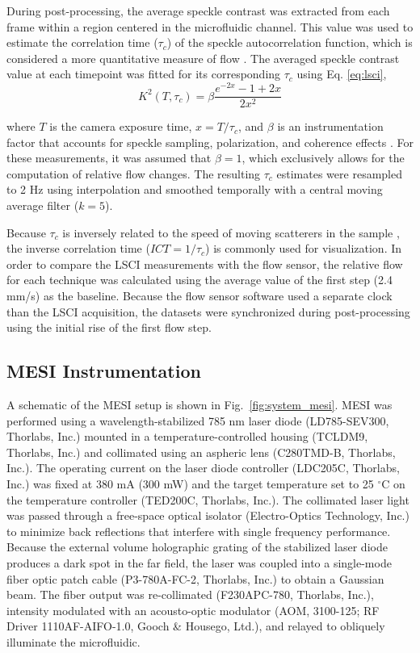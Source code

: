 \documentclass[12pt]{spieman}
\begin{document}
\begin{spacing}{2}
During post-processing, the average speckle contrast was extracted from each frame within a region centered in the microfluidic channel. This value was used to estimate the correlation time ($\tau_{c}$) of the speckle autocorrelation function, which is considered a more quantitative measure of flow \cite{Briers:1996kfa}. The averaged speckle contrast value at each timepoint was fitted for its corresponding $\tau_{c}$ using Eq. \ref{eq:lsci},
%
\begin{equation}
    \label{eq:lsci}
    K^2(T, \tau_{c}) = \beta\frac{e^{-2x}-1+2x}{2x^2}
\end{equation}

\noindent where $T$ is the camera exposure time, $x=T/\tau_{c}$, and $\beta$ is an instrumentation factor that accounts for
speckle sampling, polarization, and coherence effects \cite{Bandyopadhyay:2005bg}. For these measurements, it was assumed that $\beta=1$, which exclusively allows for the computation of relative flow changes. The resulting $\tau_c$ estimates were resampled to 2 Hz using interpolation and smoothed temporally with a central moving average filter ($k=5$).

Because $\tau_c$ is inversely related to the speed of moving scatterers in the sample \cite{Bonner:1981hg}, the inverse correlation time ($ICT = 1/\tau_c$) is commonly used for visualization. In order to compare the LSCI measurements with the flow sensor, the relative flow for each technique was calculated using the average value of the first step (2.4 mm/s) as the baseline. Because the flow sensor software used a separate clock than the LSCI acquisition, the datasets were synchronized during post-processing using the initial rise of the first flow step.


\subsection{MESI Instrumentation}
\label{sect:methods_mesi_system}

A schematic of the MESI setup is shown in Fig.~\ref{fig:system_mesi}. MESI was performed using a wavelength-stabilized 785 nm laser diode (LD785-SEV300, Thorlabs, Inc.) mounted in a temperature-controlled housing (TCLDM9, Thorlabs, Inc.) and collimated using an aspheric lens (C280TMD-B, Thorlabs, Inc.). The operating current on the laser diode controller (LDC205C, Thorlabs, Inc.) was fixed at 380 mA (300 mW) and the target temperature set to 25 $^\circ$C on the temperature controller (TED200C, Thorlabs, Inc.). The collimated laser light was passed through a free-space optical isolator (Electro-Optics Technology, Inc.) to minimize back reflections that interfere with single frequency performance. Because the external volume holographic grating of the stabilized laser diode produces a dark spot in the far field, the laser was coupled into a single-mode fiber optic patch cable (P3-780A-FC-2, Thorlabs, Inc.) to obtain a Gaussian beam. The fiber output was re-collimated (F230APC-780, Thorlabs, Inc.), intensity modulated with an acousto-optic modulator (AOM, 3100-125; RF Driver 1110AF-AIFO-1.0, Gooch \& Housego, Ltd.), and relayed to obliquely illuminate the microfluidic.


\end{spacing}
\end{document}
